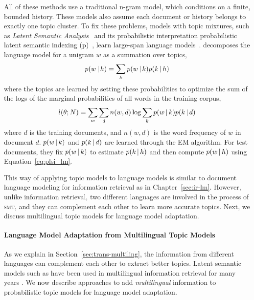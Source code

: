 All of these methods use a traditional n-gram model, which conditions on a finite, bounded history.
These models also assume each document or history belongs
to exactly one topic cluster.
To fix these problems, models with topic mixtures, such as
\emph{Latent Semantic Analysis}~\citep[\textsc{lsa}]{deerwester-90}
and its probabilistic interpretation probabilistic latent semantic
indexing (p)~\citep[\textsc{plsi}]{hofmann-99},
learn large-span language
models~\citep{Bellegarda-1997,Coccaro-1998,Gildea-1999}. \citet{Gildea-1999}
decomposes the language model for a unigram $w$ as a summation over topics,
\begin{align}
\label{eq:plsi_lm}
p(w \, | \, h) = \sum_k p(w \, | \, k) p(k \, | \, h)
\end{align}
where the topics are learned by setting these probabilities to optimize the sum of the logs of the marginal probabilities of all words in the training corpus,
\begin{align}
l(\theta; N) = \sum_w \sum_d n(w, d) \log \sum_k p(w \, | \, k) p(k \, | \, d)
\end{align}
where $d$ is the training documents, and $n(w,d)$ is the word
frequency of $w$ in document $d$. $p(w \, | \, k)$ and $p(k \, | \, d)$ are
learned through the EM algorithm. For test documents, they fix $p(w \, | \,
k)$ to estimate $p(k \, | \, h)$ and then compute $p(w \, | \, h)$ using Equation~\ref{eq:plsi_lm}. 

This way of applying topic models to language models is 
similar to document language modeling for information retrieval
as in Chapter~\ref{sec:ir-lm}. However, unlike
information retrieval, two different languages are involved in the
process of \textsc{smt}, and they can complement each other to learn
more accurate topics. Next, we discuss multilingual topic models
for language model adaptation.

\paragraph{Language Model Adaptation from Multilingual Topic Models}


As we explain in Section~\ref{sec:trans-multiling}, the information
from different languages can complement each other to extract better
topics. Latent semantic models such as  have been used in
multilingual information retrieval for many years
\citep{carbonell1997translingual}.
We now describe approaches to add \emph{multilingual} information to probabilistic topic models
for language model adaptation.

